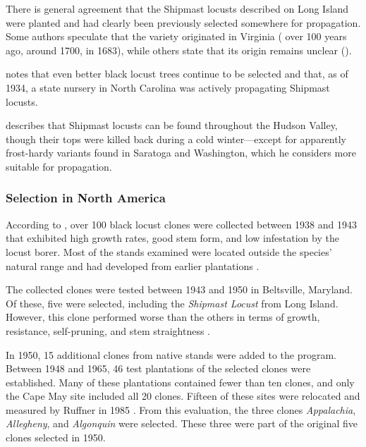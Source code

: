 There is general agreement that the Shipmast locusts described on Long Island were planted and had clearly been previously selected somewhere for propagation. Some authors speculate that the variety originated in Virginia (\citet{hicks1883robinie} over 100 years ago, \citet{raber1936shipmast} around 1700, \citet{detwiler1937robinie} in 1683), while others state that its origin remains unclear (\citet{raber1938robinie}).

\citet{detwiler1937robinie} notes that even better black locust trees continue to be selected and that, as of 1934, a state nursery in North Carolina was actively propagating Shipmast locusts.


\citet{cope1938robinie} describes that Shipmast locusts can be found throughout the Hudson Valley, though their tops were killed back during a cold winter—except for apparently frost-hardy variants found in Saratoga and Washington, which he considers more suitable for propagation.

\subsubsection{Selection in North America}

According to \citet{santamour1970robinie,steinergroup1987robinie}, over 100 black locust clones were collected between 1938 and 1943 that exhibited high growth rates, good stem form, and low infestation by the locust borer. Most of the stands examined were located outside the species' natural range and had developed from earlier plantations \citep{hopp1941robinie}.

The collected clones were tested between 1943 and 1950 in Beltsville, Maryland. Of these, five were selected, including the \emph{Shipmast Locust} from Long Island. However, this clone performed worse than the others in terms of growth, resistance, self-pruning, and stem straightness \citep{santamour1960robinie}.

In 1950, 15 additional clones from native stands were added to the program. Between 1948 and 1965, 46 test plantations of the selected clones were established. Many of these plantations contained fewer than ten clones, and only the Cape May site included all 20 clones. Fifteen of these sites were relocated and measured by Ruffner in 1985 \citep{bongarten1992robinie}. From this evaluation, the three clones \emph{Appalachia}, \emph{Allegheny}, and \emph{Algonquin} were selected. These three were part of the original five clones selected in 1950.

